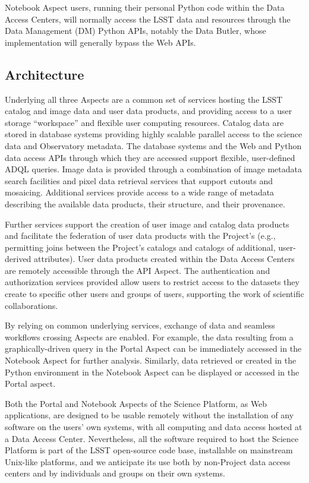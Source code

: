 Notebook Aspect users, running their personal Python code within the Data Access Centers, will normally access the LSST data and resources through the Data Management (DM) Python APIs, notably the Data Butler, whose implementation will generally bypass the Web APIs.

\subsection{Architecture}\label{architecture-intro}

Underlying all three Aspects are a common set of services hosting the LSST catalog and image data and user data products, and providing access to a user storage ``workspace'' and flexible user computing resources.
Catalog data are stored in database systems providing highly scalable parallel access to the science data and Observatory metadata.
The database systems and the Web and Python data access APIs through which they are accessed support flexible, user-defined ADQL queries.
Image data is provided through a combination of image metadata search facilities and pixel data retrieval services that support cutouts and mosaicing.
Additional services provide access to a wide range of metadata describing the available data products, their structure, and their provenance.

Further services support the creation of user image and catalog data products and facilitate the federation of user data products with the Project's
(e.g., permitting joins between the Project's catalogs and catalogs of additional, user-derived attributes).
User data products created within the Data Access Centers are remotely accessible through the API Aspect.
The authentication and authorization services provided allow users to restrict access to the datasets they create to specific other users and groups of users, supporting the work of scientific collaborations.

By relying on common underlying services, exchange of data and seamless workflows crossing Aspects are enabled.
For example, the data resulting from a graphically-driven query in the Portal Aspect can be immediately accessed in the Notebook Aspect for further analysis.
Similarly, data retrieved or created in the Python environment in the Notebook Aspect can be displayed or accessed in the Portal aspect.

Both the Portal and Notebook Aspects of the Science Platform, as Web applications, are designed to be usable remotely without the installation of any software on the users' own systems, with all computing and data access hosted at a Data Access Center.
Nevertheless, all the software required to host the Science Platform is part of the LSST open-source code base, installable on mainstream Unix-like platforms, and we anticipate its use both by non-Project data access centers and by individuals and groups on their own systems.

